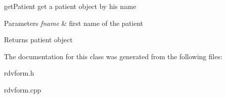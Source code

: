 get\+Patient get a patient object by his name 


\begin{DoxyParams}{Parameters}
{\em fname} & first name of the patient \\
\hline
\end{DoxyParams}
\begin{DoxyReturn}{Returns}
patient object 
\end{DoxyReturn}


The documentation for this class was generated from the following files\+:\begin{DoxyCompactItemize}
\item 
rdvform.\+h\item 
rdvform.\+cpp\end{DoxyCompactItemize}
